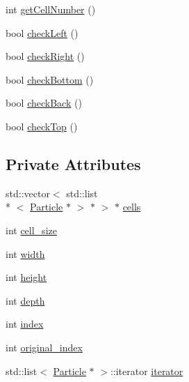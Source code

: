 \begin{DoxyCompactItemize}
\item 
int \hyperlink{classutils_1_1LCInnerParticleIterator_aac709e0bd8324335cf5e261abcc462d5}{get\-Cell\-Number} ()
\item 
bool \hyperlink{classutils_1_1LCInnerParticleIterator_a3351f46c7b9cc23b8c7cfaed21a3ab21}{check\-Left} ()
\item 
bool \hyperlink{classutils_1_1LCInnerParticleIterator_a9b7095262c5822b79f2fe5b9c864bc5c}{check\-Right} ()
\item 
bool \hyperlink{classutils_1_1LCInnerParticleIterator_ac0a650efc58403e2acbf191ee25f99d5}{check\-Bottom} ()
\item 
bool \hyperlink{classutils_1_1LCInnerParticleIterator_af014915da19b22640850eb676b8e0ab0}{check\-Back} ()
\item 
bool \hyperlink{classutils_1_1LCInnerParticleIterator_a079d0a446521b35730ca4f3d6204f5e7}{check\-Top} ()
\end{DoxyCompactItemize}
\subsection*{Private Attributes}
\begin{DoxyCompactItemize}
\item 
std\-::vector$<$ std\-::list\\*
$<$ \hyperlink{classParticle}{Particle} $\ast$ $>$ $\ast$ $>$ $\ast$ \hyperlink{classutils_1_1LCInnerParticleIterator_a421358a111515986b506391956873ca8}{cells}
\item 
int \hyperlink{classutils_1_1LCInnerParticleIterator_a12d1e7f0dcc83d5ec4e09819b9e8f083}{cell\-\_\-size}
\item 
int \hyperlink{classutils_1_1LCInnerParticleIterator_a84770d6e782309bfc11ba2f965cb8f5c}{width}
\item 
int \hyperlink{classutils_1_1LCInnerParticleIterator_a1c2df47ebcba8c8c3d75ae2b7a136d7c}{height}
\item 
int \hyperlink{classutils_1_1LCInnerParticleIterator_a2a6d53e94efa6547736f66a6b0713c29}{depth}
\item 
int \hyperlink{classutils_1_1LCInnerParticleIterator_a27c807948fc9bfd2a30c94847530c39a}{index}
\item 
int \hyperlink{classutils_1_1LCInnerParticleIterator_a78f4884749444bd1ee25d874167dd582}{original\-\_\-index}
\item 
std\-::list$<$ \hyperlink{classParticle}{Particle} $\ast$ $>$\-::iterator \hyperlink{classutils_1_1LCInnerParticleIterator_a556926724858f489ff82ba151748bd4d}{iterator}
\end{DoxyCompactItemize}


